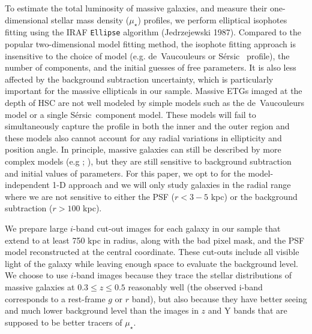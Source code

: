 \documentclass[a4paper,fleqn,usenatbib]{mnras}
\def\ser{{S\'{e}rsic\ }}
\def\mden{{$\mu_{\star}$}}
\begin{document}
    To estimate the total luminosity of massive galaxies, and measure their 
    one-dimensional stellar mass density (\mden{}) profiles, we perform elliptical 
    isophotes fitting using the IRAF \texttt{Ellipse} algorithm (Jedrzejewski 1987).  
    Compared to the popular two-dimensional model fitting method, the isophote fitting
    approach is insensitive to the choice of model (e.g. de~Vaucouleurs or \ser{} 
    profile), the number of components, and the initial guesses of free parameters. 
    It is also less affected by the background subtraction uncertainty, which is 
    particularly important for the massive ellipticals in our sample.
    Massive ETGs imaged at the depth of HSC are not well modeled by simple models such 
    as the de~Vaucouleurs model or a single \ser component model. 
    These models will fail to simultaneously capture the profile in both the inner and 
    the outer region and these models also cannot account for any radial variations in 
    ellipticity and position angle. 
    In principle, massive galaxies can still be described by more complex 
    models (e.g \citealt{Huang2013a}; \citealt{Huang2013b}), but they are still 
    sensitive to background subtraction and initial values of parameters. 
    For this paper, we opt to for the model-independent 1-D approach and we will only 
    study galaxies in the radial range where we are not sensitive to either the PSF 
    ($r<3-5$ kpc) or the background subtraction ($r>100$ kpc). 
        
    We prepare large $i$-band cut-out images for each galaxy in our sample that extend 
    to at least 750 kpc in radius, along with the bad pixel mask, and the PSF model 
    reconstructed at the central coordinate. 
    These cut-outs include all visible light of the galaxy while leaving enough space 
    to evaluate the background level. 
    We choose to use $i$-band images because they trace the stellar distributions of 
    massive galaxies at $0.3 \leq z \leq 0.5$ reasonably well 
    (the observed i-band corresponds to a rest-frame $g$ or $r$ band), but also 
    because they have better seeing and much lower background level than the images 
    in $z$ and Y bands that are supposed to be better tracers of \mden{}. 
    
\end{document}
